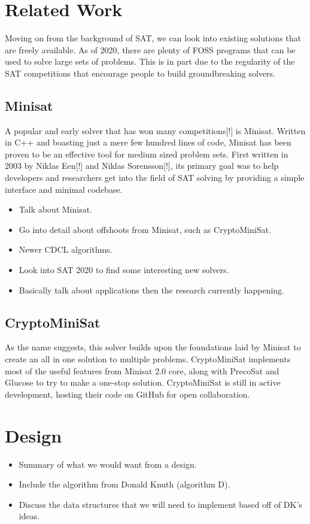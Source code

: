 \documentclass{article}
\begin{document}
\section{Related Work}
Moving on from the background of SAT, we can look into existing solutions that are freely available.
As of 2020, there are plenty of FOSS programs that can be used to solve large sets of problems. This
is in part due to the regularity of the SAT competitions that encourage people to build
groundbreaking solvers.

\subsection{Minisat}
A popular and early solver that has won many competitions[!] is Minisat. Written in C++ and boasting
just a mere few hundred lines of code, Minisat has been proven to be an effective tool for medium
sized problem sets. First written in 2003 by Niklas Een[!] and Niklas Sorensson[!], its primary goal
was to help developers and researchers get into the field of SAT solving by providing a simple
interface and minimal codebase.

\begin{itemize}
    \item Talk about Minisat.
    \item Go into detail about offshoots from Minisat, such as CryptoMiniSat.
    \item Newer CDCL algorithms.
    \item Look into SAT 2020 to find some interesting new solvers.
    \item Basically talk about applications then the research currently happening.
\end{itemize}

\subsection{CryptoMiniSat}
As the name suggests, this solver builds upon the foundations laid by Minisat to create an all in
one solution to multiple problems. CryptoMiniSat implements most of the useful features from Minisat
2.0 core, along with PrecoSat and Glucose to try to make a one-stop solution. CryptoMiniSat is still
in active development, hosting their code on GitHub for open collaboration.


\section{Design}
\begin{itemize}
    \item Summary of what we would want from a design.
    \item Include the algorithm from Donald Knuth (algorithm D).
    \item Discuss the data structures that we will need to implement based off of DK's ideas.
\end{itemize}
\end{document}
